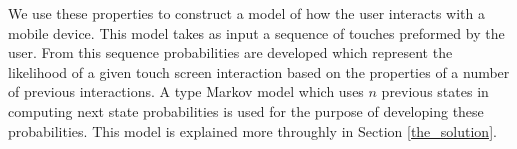 We use these properties to construct
a model of how the user interacts with a mobile device.
This model takes as input a sequence of touches preformed
by the user.
From this sequence
probabilities are developed
which represent the likelihood of a given touch screen interaction
based on the properties of a number of previous interactions.
A type Markov model which uses $n$ previous states
in computing next state probabilities
is used for the purpose of developing these probabilities.
This model is explained more throughly in
Section \ref{the_solution}. %





